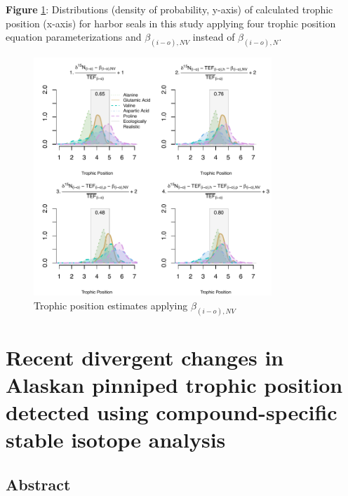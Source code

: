 \documentclass [11pt, proquest] {uwthesis}[2015/03/03]
\begin{document}
\textbf{Figure} \ref{fig:nvbeta}: Distributions (density of probability,
y-axis) of calculated trophic position (x-axis) for harbor seals in this
study applying four trophic position equation parameterizations and
\(\beta_{(i-o),NV}\) instead of \(\beta_{(i-o),N}\). \newline 
\begin{figure}[h]
\centering
  \includegraphics[width=0.8\textwidth]{figure/Ch3/FigureS3.pdf}
  \caption{Trophic position estimates applying $\beta_{(i-o),NV}$}
  \label{fig:nvbeta}
\end{figure}
\clearpage

\chapter{Recent divergent changes in Alaskan pinniped trophic position
detected using compound-specific stable isotope
analysis}\label{recent-divergent-changes-in-alaskan-pinniped-trophic-position-detected-using-compound-specific-stable-isotope-analysis}

\section{Abstract}\label{abstract-3}
\end{document}
